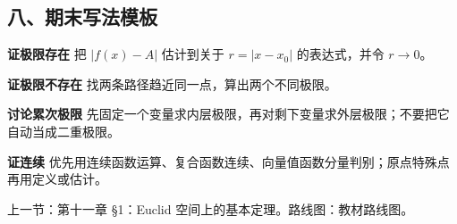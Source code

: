 \subsection*{八、期末写法模板}

\begin{conceptbox}
\textbf{证极限存在}
把 \(|f(x)-A|\) 估计到关于 \(r=|x-x_0|\) 的表达式，并令 \(r\to0\)。
\end{conceptbox}

\begin{conceptbox}
\textbf{证极限不存在}
找两条路径趋近同一点，算出两个不同极限。
\end{conceptbox}

\begin{conceptbox}
\textbf{讨论累次极限}
先固定一个变量求内层极限，再对剩下变量求外层极限；不要把它自动当成二重极限。
\end{conceptbox}

\begin{conceptbox}
\textbf{证连续}
优先用连续函数运算、复合函数连续、向量值函数分量判别；原点特殊点再用定义或估计。
\end{conceptbox}

上一节：第十一章 §1：Euclid 空间上的基本定理。路线图：教材路线图。
